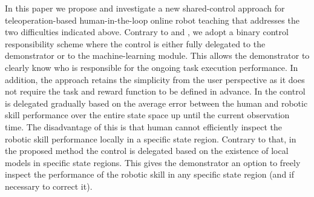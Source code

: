 In this paper we propose and investigate a new shared-control approach for teleoperation-based human-in-the-loop online robot teaching that addresses the two difficulties indicated above. Contrary to \cite{Peternel2013b} and \cite{Zamani2015}, we adopt a binary control responsibility scheme where the control is either fully delegated to the demonstrator or to the machine-learning module. This allows the demonstrator to clearly know who is responsible for the ongoing task execution performance. In addition, the approach retains the simplicity from the user perspective \cite{Peternel2013b} as it does not require the task and reward function to be defined in advance. In \cite{Peternel2013b} the control is delegated gradually based on the average error between the human and robotic skill performance over the entire state space up until the current observation time. The disadvantage of this is that human cannot efficiently inspect the robotic skill performance locally in a specific state region. Contrary to that, in the proposed method the control is delegated based on the existence of local models in specific state regions. This gives the demonstrator an option to freely inspect the performance of the robotic skill in any specific state region (and if necessary to correct it).

